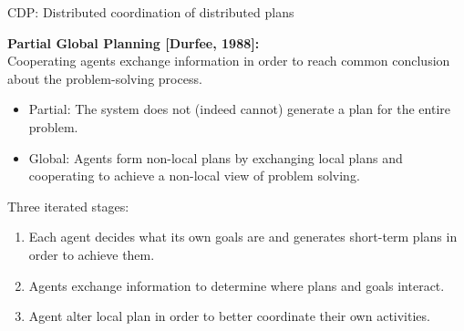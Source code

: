 \documentclass[9pt]{beamer}
\begin{document}
\begin{frame}{CDP: Distributed coordination of distributed plans}
\begin{small}

\textbf{Partial Global Planning [Durfee, 1988]:}\\
Cooperating agents \textcolor{CS-1light}{exchange information} in order to reach common conclusion about the problem-solving process.
\vspace{-2mm}
\begin{itemize}
\item \textcolor{CS-1light}{Partial}: The system does not (indeed cannot) generate a plan for the entire problem.
\item \textcolor{CS-1light}{Global}: Agents form non-local plans by exchanging local plans and cooperating to achieve a non-local view of problem solving.  
\end{itemize}

\vspace{4mm}

Three iterated stages:
\vspace{-2mm}
\begin{enumerate}
\item \textcolor{CS-1light}{Each agent} decides what its own goals are and \textcolor{CS-1light}{generates short-term plans} in order to achieve them.
\item Agents \textcolor{CS-1light}{exchange information} to determine where plans and goals interact.
\item Agent \textcolor{CS-1light}{alter local plan} in order to better coordinate their own activities.
\end{enumerate}

\end{small}
\end{frame}
\end{document}
